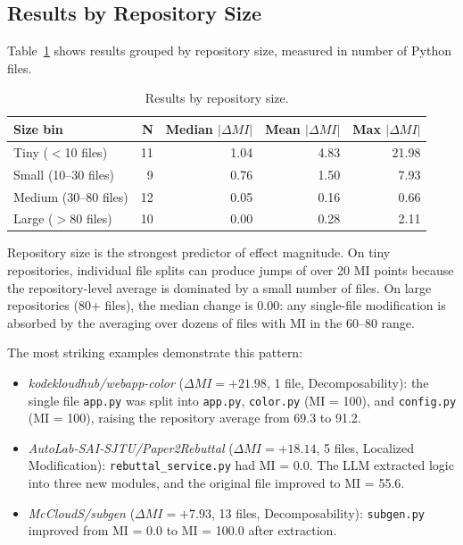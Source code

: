 \documentclass[sigconf,review,anonymous]{acmart}
\begin{document}
\subsection{Results by Repository Size}

Table~\ref{tab:exp5_size} shows results grouped by repository size, measured in number of Python files.

\begin{table}[H]
\centering
\small
\caption{Results by repository size.}
\label{tab:exp5_size}
\begin{tabular}{lrrrr}
\toprule
\textbf{Size bin} & \textbf{N} & \textbf{Median $|\Delta MI|$} & \textbf{Mean $|\Delta MI|$} & \textbf{Max $|\Delta MI|$} \\
\midrule
Tiny ($<$10 files)    & 11 & 1.04 & 4.83 & 21.98 \\
Small (10--30 files)  & 9  & 0.76 & 1.50 & 7.93  \\
Medium (30--80 files) & 12 & 0.05 & 0.16 & 0.66  \\
Large ($>$80 files)   & 10 & 0.00 & 0.28 & 2.11  \\
\bottomrule
\end{tabular}
\end{table}

Repository size is the strongest predictor of effect magnitude. On tiny repositories, individual file splits can produce jumps of over 20 MI points because the repository-level average is dominated by a small number of files. On large repositories (80+ files), the median change is 0.00: any single-file modification is absorbed by the averaging over dozens of files with MI in the 60--80 range.

The most striking examples demonstrate this pattern:

\begin{itemize}[nosep]
    \item \textit{kodekloudhub/webapp-color} ($\Delta MI = +21.98$, 1 file, Decomposability): the single file \texttt{app.py} was split into \texttt{app.py}, \texttt{color.py} (MI = 100), and \texttt{config.py} (MI = 100), raising the repository average from 69.3 to 91.2.
    \item \textit{AutoLab-SAI-SJTU/Paper2Rebuttal} ($\Delta MI = +18.14$, 5 files, Localized Modification): \texttt{rebuttal\_service.py} had MI = 0.0. The LLM extracted logic into three new modules, and the original file improved to MI = 55.6.
    \item \textit{McCloudS/subgen} ($\Delta MI = +7.93$, 13 files, Decomposability): \texttt{subgen.py} improved from MI = 0.0 to MI = 100.0 after extraction.
\end{itemize}
\end{document}
